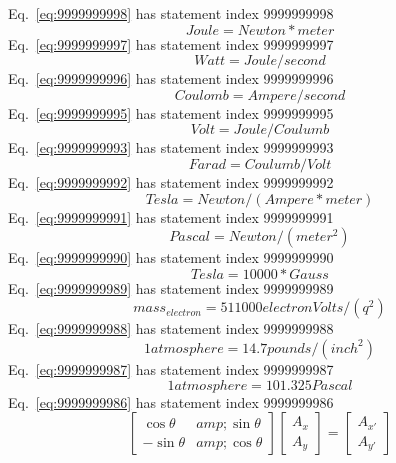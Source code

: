 \documentclass[12pt]{report}
\begin{document}
Eq.~\ref{eq:9999999998} has statement index 9999999998
\begin{equation}
Joule = Newton*meter
\label{eq:9999999998}
\end{equation}
Eq.~\ref{eq:9999999997} has statement index 9999999997
\begin{equation}
Watt=Joule/second
\label{eq:9999999997}
\end{equation}
Eq.~\ref{eq:9999999996} has statement index 9999999996
\begin{equation}
Coulomb=Ampere/second
\label{eq:9999999996}
\end{equation}
Eq.~\ref{eq:9999999995} has statement index 9999999995
\begin{equation}
Volt=Joule/Coulumb
\label{eq:9999999995}
\end{equation}
Eq.~\ref{eq:9999999993} has statement index 9999999993
\begin{equation}
Farad = Coulumb/Volt
\label{eq:9999999993}
\end{equation}
Eq.~\ref{eq:9999999992} has statement index 9999999992
\begin{equation}
Tesla= Newton/(Ampere*meter)
\label{eq:9999999992}
\end{equation}
Eq.~\ref{eq:9999999991} has statement index 9999999991
\begin{equation}
Pascal = Newton/(meter^2)
\label{eq:9999999991}
\end{equation}
Eq.~\ref{eq:9999999990} has statement index 9999999990
\begin{equation}
Tesla = 10000*Gauss
\label{eq:9999999990}
\end{equation}
Eq.~\ref{eq:9999999989} has statement index 9999999989
\begin{equation}
mass_{electron} = 511000 electronVolts/(q^2)
\label{eq:9999999989}
\end{equation}
Eq.~\ref{eq:9999999988} has statement index 9999999988
\begin{equation}
1 atmosphere = 14.7 pounds/(inch^2) 
\label{eq:9999999988}
\end{equation}
Eq.~\ref{eq:9999999987} has statement index 9999999987
\begin{equation}
1 atmosphere = 101.325 Pascal
\label{eq:9999999987}
\end{equation}
Eq.~\ref{eq:9999999986} has statement index 9999999986
\begin{equation}
\left[\begin{array}{cc}\cos\theta &amp; \sin\theta\\-\sin\theta &amp; \cos\theta\end{array}\right]\left[\begin{array}{c}A_x \\ A_y \end{array}\right]=\left[\begin{array}{c}A_{x'} \\ A_{y'} \end{array}\right]
\label{eq:9999999986}
\end{equation}
\end{document}
